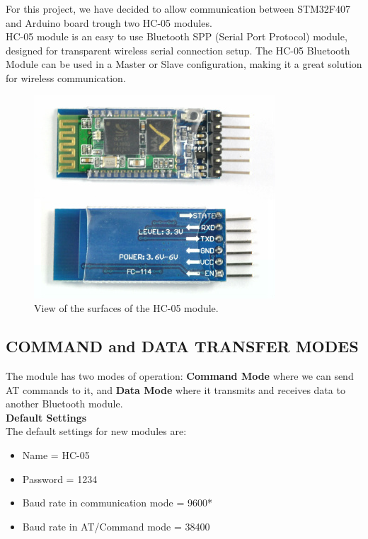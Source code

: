 \author{Yuri}
For this project, we have decided to allow communication between STM32F407 and Arduino board trough two HC-05 modules.\\
HC-05 module is an easy to use Bluetooth SPP (Serial Port Protocol) module, designed for transparent wireless serial connection setup. The HC-05 Bluetooth Module can be used in a Master or Slave configuration, making it a great solution for wireless communication.\\

\begin{figure}[H]
	\centering
	\includegraphics[width=\textwidth]
	{files/images/hc05_view}
	\caption{View of the surfaces of the HC-05 module.}
\end{figure}

\subsection{COMMAND and DATA TRANSFER MODES}
The module has two modes of operation: \textbf{Command Mode} where we can send AT commands to it, and \textbf{Data Mode} where it transmits and receives data to another Bluetooth module.\\

\textbf{Default Settings}\\
The default settings for new modules are:
\begin{itemize}
\item Name = HC-05
\item Password = 1234
\item Baud rate in communication mode = 9600*
\item Baud rate in AT/Command mode = 38400
\end{itemize}

